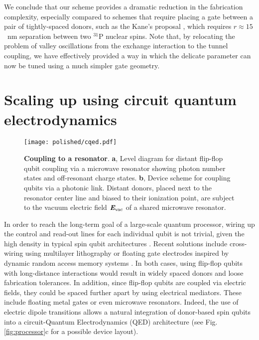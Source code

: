 We conclude that our scheme provides a dramatic reduction in the fabrication complexity, especially compared to schemes that require placing a gate between a pair of tightly-spaced donors, such as the Kane's proposal \cite{Kane1998}, which requires $r\approx15$~nm separation between two $^{31}$P nuclear spins. Note that, by relocating the problem of valley oscillations from the exchange interaction \cite{Kane1998} to the tunnel coupling, we have effectively provided a way in which the delicate parameter can now be tuned using a much simpler gate geometry.


\section{Scaling up using circuit quantum electrodynamics}

\begin{figure}
	\centering
	\texttt{[image: polished/cqed.pdf]}
	\caption[Coupling to a resonator]{\textbf{Coupling to a resonator}.
		\textbf{a}, Level diagram for distant flip-flop qubit coupling via a microwave resonator showing photon number states and off-resonant charge states. 
		\textbf{b}, Device scheme for coupling qubits via a photonic link. Distant donors, placed next to the resonator center line and biased to their ionization point, are subject to the vacuum electric field $\textit{\textbf{E}}_{\rm vac}$ of a shared microwave resonator.}
	\label{fig:cqed}
\end{figure}

In order to reach the long-term goal of a large-scale quantum processor, wiring up the control and read-out lines for each individual qubit is not trivial, given the high density in typical spin qubit architectures \cite{Vandersypen2016}. Recent solutions include cross-wiring using multilayer lithography \cite{Hill2015} or floating gate electrodes inspired by dynamic random access memory systems \cite{Veldhorst2016}. In both cases, using flip-flop qubits with long-distance interactions would result in widely spaced donors and loose fabrication tolerances. In addition, since flip-flop qubits are coupled via electric fields, they could be spaced further apart by using electrical mediators. These include floating metal gates \cite{Trifunovic2012} or even microwave resonators. Indeed, the use of electric dipole transitions allows a natural integration of donor-based spin qubits into a circuit-Quantum Electrodynamics (QED) architecture \cite{Blais2004,Childress2004,Xiang2013,Mi2016} (see Fig. \ref{fig:processor}c for a possible device layout).

